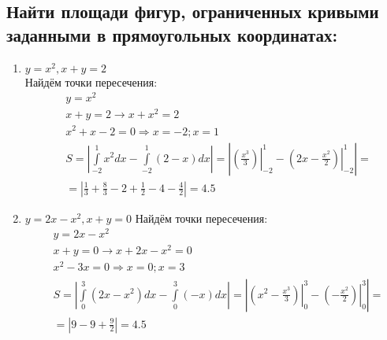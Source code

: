 \documentclass[a4paper, 12pt]{article}
\begin{document}
\subsection{Найти площади фигур, ограниченных кривыми заданными в прямоугольных координатах: }
\begin{enumerate}
 \item 
 $y = x^2, x+y = 2$ \\
 Найдём точки пересечения: 
 \begin{align*}
  &y = x^2 \\
  &x + y = 2 \to x +x^2 = 2 \\
  &x^2 +x -2 = 0 \Rightarrow x=-2;x=1 \\
  & S = \left|
  \int\limits_{-2}^1 x^2dx - \int\limits_{-2}^1 (2-x)dx
  \right| = 
  \left|
  \left.\left(\frac{x^3}{3}\right)\right|_{-2}^1 - \left.\left(2x - \frac{x^2}{2}\right)\right|_{-2}^1
  \right| = \\
  &=
  \left|
  \frac{1}{3} + \frac{8}{3} -2 +\frac{1}{2} -4 -\frac{4}{2}
  \right| = 4.5
 \end{align*}
\item
$y = 2x-x^2, x+y = 0$  
Найдём точки пересечения: 
\begin{align*}
 &y = 2x - x^2 \\
 &x + y = 0 \to x +2x-x^2=0\\
 &x^2-3x=0 \Rightarrow x=0;x=3\\
 & S = \left|
  \int\limits_0^3 (2x-x^2)dx - \int\limits_0^3 (-x)dx
  \right| = 
  \left|
  \left.\left(x^2 - \frac{x^3}{3}\right)\right|_0^3 -
  \left.\left(-\frac{x^2}{2}\right)\right|_0^3
  \right| = \\
  &=
  \left|
  9 - 9 +\frac{9}{2}
  \right| = 4.5
\end{align*}
\begin{tikzpicture}

\end{tikzpicture}
\end{enumerate}
\end{document}
